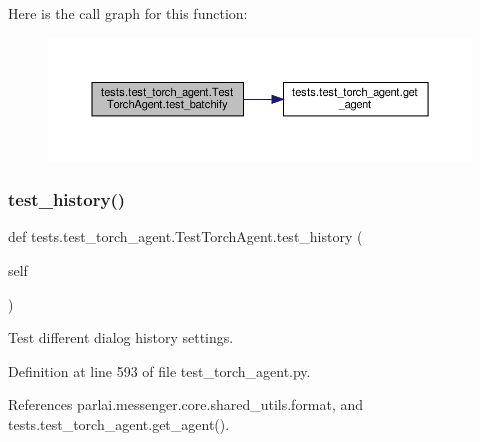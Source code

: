 Here is the call graph for this function\+:
\nopagebreak
\begin{figure}[H]
\begin{center}
\leavevmode
\includegraphics[width=350pt]{classtests_1_1test__torch__agent_1_1TestTorchAgent_aad1075dad0c291b524d84ec9526177dd_cgraph}
\end{center}
\end{figure}
\mbox{\label{classtests_1_1test__torch__agent_1_1TestTorchAgent_a3c5504828399a2bb0d776baf1a744f71}} 
\subsubsection{\texorpdfstring{test\+\_\+history()}{test\_history()}}
{\footnotesize\ttfamily def tests.\+test\+\_\+torch\+\_\+agent.\+Test\+Torch\+Agent.\+test\+\_\+history (\begin{DoxyParamCaption}\item[{}]{self }\end{DoxyParamCaption})}

\begin{DoxyVerb}Test different dialog history settings.\end{DoxyVerb}
 

Definition at line 593 of file test\+\_\+torch\+\_\+agent.\+py.



References parlai.\+messenger.\+core.\+shared\+\_\+utils.\+format, and tests.\+test\+\_\+torch\+\_\+agent.\+get\+\_\+agent().

